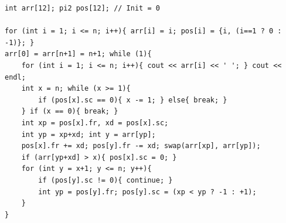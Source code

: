 \begin{verbatim}
int arr[12]; pi2 pos[12]; // Init = 0

for (int i = 1; i <= n; i++){ arr[i] = i; pos[i] = {i, (i==1 ? 0 : -1)}; }
arr[0] = arr[n+1] = n+1; while (1){
	for (int i = 1; i <= n; i++){ cout << arr[i] << ' '; } cout << endl;
	int x = n; while (x >= 1){
		if (pos[x].sc == 0){ x -= 1; } else{ break; }
	} if (x == 0){ break; }
	int xp = pos[x].fr, xd = pos[x].sc;
	int yp = xp+xd; int y = arr[yp];
	pos[x].fr += xd; pos[y].fr -= xd; swap(arr[xp], arr[yp]);
	if (arr[yp+xd] > x){ pos[x].sc = 0; }
	for (int y = x+1; y <= n; y++){
		if (pos[y].sc != 0){ continue; }
		int yp = pos[y].fr; pos[y].sc = (xp < yp ? -1 : +1);
	}
}
\end{verbatim}